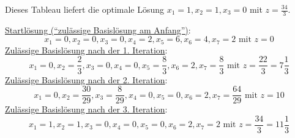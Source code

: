\documentclass[10pt,a4paper,oneside,ngerman,numbers=noenddot]{scrartcl}
\begin{document}
		Dieses Tableau liefert die optimale Lösung $x_{1} = 1, x_{2} = 1, x_{3} = 0$ mit $z = \frac{34}{3}$.
		
		\underline{Startlösung ("`zulässige Basislösung am Anfang"')}:
		\[
			x_{1} = 0, x_{2} = 0, x_{3} = 0, x_{4} = 2, x_{5} = 6, x_{6} = 4, x_{7} = 2 \text{ mit } z = 0
		\]
		\underline{Zulässige Basislösung nach der 1. Iteration}:
		\[
			x_{1} = 0, x_{2} = \frac{2}{3}, x_{3} = 0, x_{4} = 0, x_{5} = \frac{8}{3}, x_{6} = 2, x_{7} = \frac{8}{3} \text{ mit } z = \frac{22}{3} = 7\frac{1}{3}
		\]
		\underline{Zulässige Basislösung nach der 2. Iteration}:
		\[
			x_{1} = 0, x_{2} = \frac{30}{29}, x_{3} = \frac{8}{29}, x_{4} = 0, x_{5} = 0, x_{6} = 2, x_{7} = \frac{64}{29} \text{ mit } z = 10
		\]
		\underline{Zulässige Basislösung nach der 3. Iteration}:
		\[
			x_{1} = 1, x_{2} = 1, x_{3} = 0, x_{4} = 0, x_{5} = 0, x_{6} = 2, x_{7} = 2 \text{ mit } z = \frac{34}{3} = 11\frac{1}{3}
		\]
\section{} %
\end{document}
